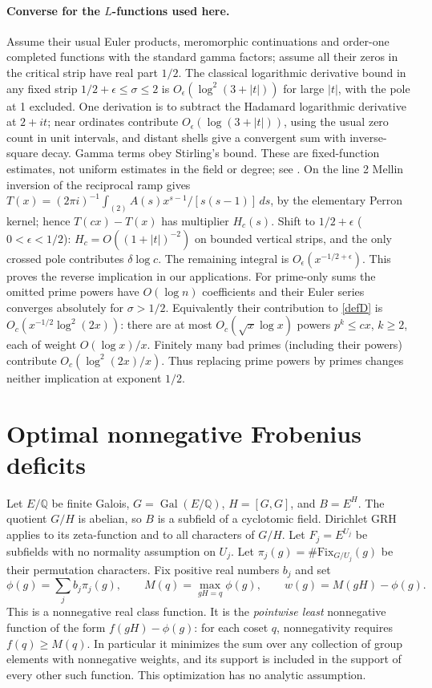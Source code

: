 \documentclass[11pt]{article}
\theoremstyle{definition}\newtheorem{definition}[theorem]{Definition}
\newcommand{\Q}{\mathbb Q}\newcommand{\C}{\mathbb C}\newcommand{\R}{\mathbb R}\newcommand{\Rea}{\operatorname{Re}}\newcommand{\Frob}{\operatorname{Frob}}\newcommand{\Gal}{\operatorname{Gal}}\newcommand{\pos}[1]{\left(#1\right)_+}
\begin{document}
\paragraph{Converse for the $L$-functions used here.} Assume their usual Euler products, meromorphic continuations and order-one completed functions with the standard gamma factors; assume all their zeros in the critical strip have real part $1/2$. The classical logarithmic derivative bound in any fixed strip $1/2+\epsilon\le\sigma\le2$ is $O_\epsilon(\log^2(3+|t|))$ for large $|t|$, with the pole at 1 excluded. One derivation is to subtract the Hadamard logarithmic derivative at $2+it$; near ordinates contribute $O_\epsilon(\log(3+|t|))$, using the usual zero count in unit intervals, and distant shells give a convergent sum with inverse-square decay. Gamma terms obey Stirling's bound. These are fixed-function estimates, not uniform estimates in the field or degree; see \cite{ik}. On the line 2 Mellin inversion of the reciprocal ramp gives $T(x)=(2\pi i)^{-1}\int_{(2)} A(s)x^{s-1}/[s(s-1)]\,ds$, by the elementary Perron kernel; hence $T(cx)-T(x)$ has multiplier $H_c(s)$. Shift to $1/2+\epsilon$ ($0<\epsilon<1/2$): $H_c=O((1+|t|)^{-2})$ on bounded vertical strips, and the only crossed pole contributes $\delta\log c$. The remaining integral is $O_\epsilon(x^{-1/2+\epsilon})$. This proves the reverse implication in our applications. For prime-only sums the omitted prime powers have $O(\log n)$ coefficients and their Euler series converges absolutely for $\sigma>1/2$. Equivalently their contribution to \eqref{defD} is $O_c(x^{-1/2}\log^2(2x))$: there are at most $O_c(\sqrt x\log x)$ powers $p^k\le cx$, $k\ge2$, each of weight $O(\log x)/x$. Finitely many bad primes (including their powers) contribute $O_c(\log^2(2x)/x)$. Thus replacing prime powers by primes changes neither implication at exponent $1/2$.

\section{Optimal nonnegative Frobenius deficits}\label{group}
Let $E/\Q$ be finite Galois, $G=\Gal(E/\Q)$, $H=[G,G]$, and $B=E^H$. The quotient $G/H$ is abelian, so $B$ is a subfield of a cyclotomic field. Dirichlet GRH applies to its zeta-function and to all characters of $G/H$. Let $F_j=E^{U_j}$ be subfields with no normality assumption on $U_j$. Let $\pi_j(g)=\#\mathrm{Fix}_{G/U_j}(g)$ be their permutation characters. Fix positive real numbers $b_j$ and set
\[
 \phi(g)=\sum_j b_j\pi_j(g),\qquad
 M(q)=\max_{gH=q}\phi(g),\qquad w(g)=M(gH)-\phi(g).
\]
This is a nonnegative real class function. It is the \emph{pointwise least} nonnegative function of the form $f(gH)-\phi(g)$: for each coset $q$, nonnegativity requires $f(q)\ge M(q)$. In particular it minimizes the sum over any collection of group elements with nonnegative weights, and its support is included in the support of every other such function. This optimization has no analytic assumption.
\end{document}
